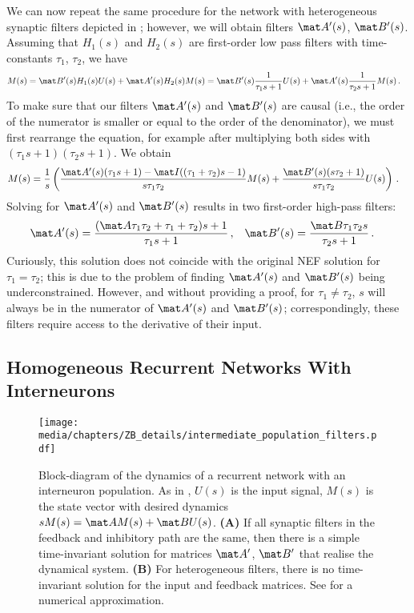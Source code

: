 We can now repeat the same procedure for the network with heterogeneous synaptic filters depicted in ; however, we will obtain filters $\mat A'(s)$, $\mat B'(s)$.
Assuming that $H_1(s)$ and $H_2(s)$ are first-order low pass filters with time-constants $\tau_1$, $\tau_2$, we have
\begin{align*}
	M(s) &= \mat B'(s) H_1(s) U(s) + \mat A'(s) H_2(s) M(s) = \mat B'(s) \frac{1}{\tau_1 s + 1} U(s) + \mat A'(s) \frac{1}{\tau_2 s + 1} M(s) \,.
	\label{eqn:hetero_dyn}
\end{align*}
To make sure that our filters $\mat A'(s)$ and $\mat B'(s)$ are causal (i.e., the order of the numerator is smaller or equal to the order of the denominator), we must first rearrange the equation, for example after multiplying both sides with $(\tau_1 s + 1) (\tau_2 s + 1)$.
We obtain
\begin{align*}
	M(s) &= \frac{1}{s} \left(
		  \frac{ \mat A'(s) (\tau_1 s + 1) - \mat I ((\tau_1 + \tau_2) s - 1 )}{s \tau_1 \tau_2} M(s)
		+ \frac{\mat B'(s) (s \tau_2 + 1)}{s \tau_1 \tau_2} U(s)
	\right) \,.
\end{align*}
Solving for $\mat A'(s)$ and $\mat B'(s)$ results in two first-order high-pass filters:
\begin{align*}
	\mat A'(s) &= \frac{(\mat A \tau_1 \tau_2 + \tau_1 + \tau_2) s + 1}{\tau_1 s + 1} \,, &
	\mat B'(s) &= \frac{\mat B \tau_1 \tau_2 s}{\tau_2 s + 1} \,.
\end{align*}
Curiously, this solution does not coincide with the original NEF solution for $\tau_1 = \tau_2$; this is due to the problem of finding $\mat A'(s)$ and $\mat B'(s)$ being underconstrained.
However, and without providing a proof, for $\tau_1 \neq \tau_2$, $s$ will always be in the numerator of $\mat A'(s)$ and $\mat B'(s)$; correspondingly, these filters require access to the derivative of their input.

\subsection{Homogeneous Recurrent Networks With Interneurons}
\label{app:granule_golgi_dynamics}

\begin{figure}
	\centering
	\texttt{[image: media/chapters/ZB\_details/intermediate\_population\_filters.pdf]}
	{\label{fig:intermediate_population_filters_a}}%
	{\label{fig:intermediate_population_filters_b}}%
	\caption[Block-diagram of recurrent networks with an interneuron population]{Block-diagram of the dynamics of a recurrent network with an interneuron population. As in , $U(s)$ is the input signal, $M(s)$ is the state vector with desired dynamics $s M(s) = \mat A M(s) + \mat B U(s)$.
	\textbf{(A)} If all synaptic filters in the feedback and inhibitory path are the same, then there is a simple time-invariant solution for matrices $\mat A'$, $\mat B'$ that realise the dynamical system.
	\textbf{(B)} For heterogeneous filters, there is no time-invariant solution for the input and feedback matrices. See  for a numerical approximation.}
\end{figure}

